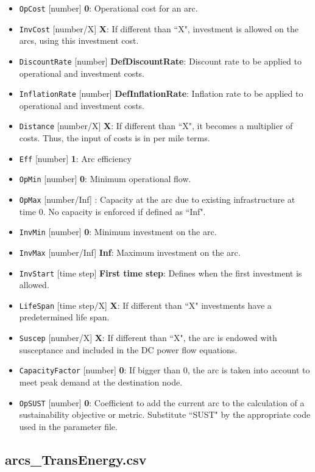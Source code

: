 \documentclass{article}
\begin{document}
\begin{itemize}
  \item \verb=OpCost= [number] \textbf{0}:  Operational cost for an arc.
  \item \verb=InvCost= [number/X] \textbf{X}: If different than ``X", investment is allowed on the arcs, using this investment cost.
  \item \verb=DiscountRate= [number] \textbf{DefDiscountRate}: Discount rate to be applied to operational and investment costs.
  \item \verb=InflationRate= [number] \textbf{DefInflationRate}: Inflation rate to be applied to operational and investment costs.
  \item \verb=Distance= [number/X] \textbf{X}: If different than ``X", it becomes a multiplier of costs. Thus, the input of costs is in per mile terms.
  \item \verb=Eff= [number] \textbf{1}:  Arc efficiency
  \item \verb=OpMin= [number] \textbf{0}: Minimum operational flow.
  \item \verb=OpMax= [number/Inf] \textbf{}: Capacity at the arc due to existing infrastructure at time 0. No capacity is enforced if defined as ``Inf".
  \item \verb=InvMin= [number] \textbf{0}:  Minimum investment on the arc.
  \item \verb=InvMax= [number/Inf] \textbf{Inf}:  Maximum investment on the arc.
  \item \verb=InvStart= [time step] \textbf{First time step}: Defines when the first investment is allowed.
  \item \verb=LifeSpan= [time step/X] \textbf{X}:  If different than ``X" investments have a predetermined life span.
  \item \verb=Suscep= [number/X] \textbf{X}:  If different than ``X", the arc is endowed with susceptance and included in the DC power flow equations.
  \item \verb=CapacityFactor= [number] \textbf{0}:  If bigger than 0, the arc is taken into account to meet peak demand at the destination node.
  \item \verb=OpSUST= [number] \textbf{0}: Coefficient to add the current arc to the calculation of a sustainability objective or metric. Substitute ``SUST" by the appropriate code used in the parameter file.
\end{itemize}



\subsection{arcs\_TransEnergy.csv}
\end{document}
